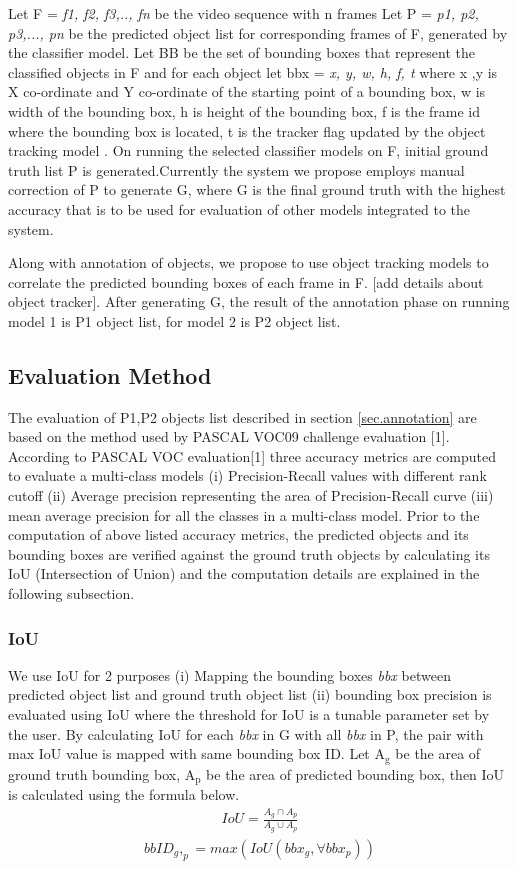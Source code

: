 \documentclass[conference]{IEEEtran}
\begin{document}
Let F = \textit{ f1, f2, f3,.., fn}  be the video sequence with n frames Let P =  \textit{p1, p2, p3,..., pn}  be the predicted  object list for corresponding frames of F, generated by the classifier model. Let BB be the set of bounding boxes that represent the classified objects in F and  for each object let bbx =  \textit{x, y, w, h, f, t} where  x ,y is  X co-ordinate and Y co-ordinate of the starting point of a bounding box, w is width of the bounding box, h is height of the bounding  box, f is the frame id where the bounding box is located, t is the tracker flag updated by the object tracking model . On running the selected classifier models on F, initial ground truth list P is generated.Currently the system we propose employs manual correction of P to generate G, where G is the final ground truth with the highest accuracy that is to be used for evaluation of other models integrated to the system. \par

Along with annotation of objects, we propose to use object tracking models to correlate the predicted bounding boxes of each frame in F. [add details about object tracker]. After generating G, the result of the annotation phase on running model 1 is P1 object list, for model 2 is P2 object list.

\subsection{Evaluation Method} \label{sec.evaluation}
The evaluation of P1,P2 objects list described in section \ref{sec.annotation} are based on the method used by PASCAL VOC09 challenge evaluation [1]. According to PASCAL VOC evaluation[1] three accuracy metrics are computed to evaluate a multi-class models (i) Precision-Recall values with different rank cutoff (ii) Average precision representing the area of Precision-Recall curve (iii) mean average precision for all the classes in a multi-class model. Prior to the computation of above listed accuracy metrics, the predicted objects and its bounding boxes are verified against the ground truth objects by calculating its IoU (Intersection of Union) and the computation details are explained in the following subsection.
\subsubsection{IoU} \label{ref.iou}
We use IoU for 2 purposes (i) Mapping the bounding boxes \textit{bbx} between predicted object list and ground truth object list (ii) bounding box precision is evaluated using IoU where the threshold for IoU is a tunable parameter set by the user. By calculating IoU for each \textit{bbx} in G with all  \textit{bbx} in P, the pair with max IoU value is mapped with same bounding box ID. Let  A$_{\text{g}}$ be the area of ground truth bounding box, A{$_{\text{p}}$} be the area of predicted bounding box, then IoU is calculated using the formula below.
\begin{align}
{IoU}= \frac {A_g \cap  A_p} {A_g \cup A_p}
\end{align}
\begin{align}
{bbID_g,_p} = {max ( IoU ( bbx_g , \forall  bbx_p ))}
\end{align}
\end{document}
